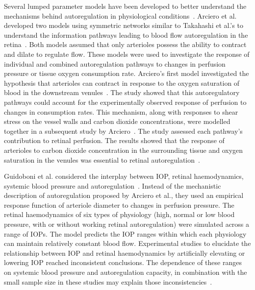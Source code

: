 \documentclass{article}
\begin{document}
Several lumped parameter models have been developed to better understand the mechanisms behind autoregulation in physiological conditions~\cite{Arciero_2008,Arciero_2013,Guidoboni_2014a}.
Arciero et al. developed two models using symmetric networks similar to Takahashi et al.'s to understand the information pathways leading to blood flow autoregulation in the retina~\cite{Arciero_2008,Arciero_2013}.
Both models assumed that only arterioles possess the ability to contract and dilate to regulate flow.
These models were used to investigate the response of individual and combined autoregulation pathways to changes in perfusion pressure or tissue oxygen consumption rate.
Arciero's first model investigated the hypothesis that arterioles can contract in response to the oxygen saturation of blood in the downstream venules~\cite{Arciero_2008}.
The study showed that this autoregulatory pathways could account for the experimentally observed response of perfusion to changes in consumption rates.
This mechanism, along with responses to shear stress on the vessel walls and carbon dioxide concentrations, were modelled together in a subsequent study by Arciero~\cite{Arciero_2013}.
The study assessed each pathway's contribution to retinal perfusion.
The results showed that the response of arterioles to carbon dioxide concentration in the surrounding tissue and oxygen saturation in the venules was essential to retinal autoregulation~\cite{Arciero_2013}.

Guidoboni et al. considered the interplay between IOP, retinal haemodynamics, systemic blood pressure and autoregulation~\cite{Guidoboni_2014a}.
Instead of the mechanistic description of autoregulation proposed by Arciero et al., they used an empirical response function of arteriole diameter to changes in perfusion pressure.
The retinal haemodynamics of six types of physiology (high, normal or low blood pressure, with or without working retinal autoregulation) were simulated across a range of IOPs.
The model predicts the IOP ranges within which each physiology can maintain relatively constant blood flow.
Experimental studies to elucidate the relationship between IOP and retinal haemodynamics by artificially elevating or lowering IOP reached inconsistent conclusions\cite{Conway_2010,Findl_1997}.
The dependence of these ranges on systemic blood pressure and autoregulation capacity, in combination with the small sample size in these studies may explain those inconsistencies~\cite{Guidoboni_2014a}.
\end{document}

